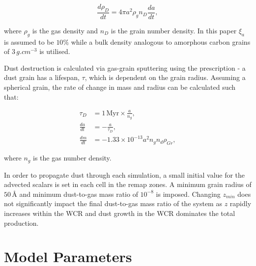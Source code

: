 \begin{equation}
  \frac{d\rho_D}{dt}  = 4 \pi a^2 \rho_g n_D \frac{da}{dt} , 
\end{equation}

\noindent
where $\rho_g$ is the gas density and $n_D$ is the grain number density.
In this paper $\xi_a$ is assumed to be $10\%$ while a bulk density analogous to amorphous carbon grains of $3 \, \si{g.cm^{-3}}$ is utilised.

Dust destruction is calculated via gas-grain sputtering using the \textcite{draine_destruction_1979} prescription - a dust grain has a lifespan, $\tau$, which is dependent on the grain radius.
Assuming a spherical grain, the rate of change in mass and radius can be calculated such that:

\begin{subequations}
  \begin{align}
           \tau_D & = 1 \, \text{Myr} \times \frac{a}{n_g} , \\
    \frac{da}{dt} & = - \frac{a}{\tau_D} , \\
    \frac{dm}{dt} & = -1.33 \times 10^{-13} a^2 n_g n_d \rho_{Gr} ,
  \end{align}
\end{subequations}

\noindent
where $n_g$ is the gas number density.


In order to propagate dust through each simulation, a small initial value for the advected scalars is set in each cell in the remap zones.
A minimum grain radius of $50 \, \text{\AA}$ and minimum dust-to-gas mass ratio of $10^{-8}$ is imposed.
Changing $z_{min}$ does not significantly impact the final dust-to-gas mass ratio of the system as $z$ rapidly increases within the WCR and dust growth in the WCR dominates the total production.

\section{Model Parameters}

